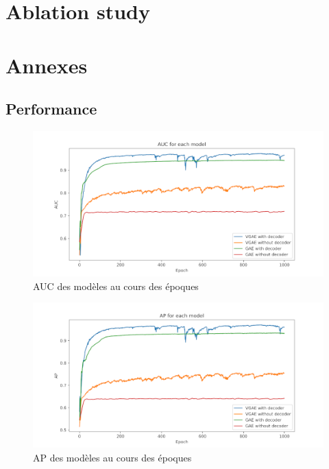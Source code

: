 \documentclass{article}
\begin{document}
\section{Ablation study}

\section{Annexes}

\subsection{Performance}
\begin{figure}[H]
    \centering
    \includegraphics[width=1\linewidth]{../test_performance/sans_degre_0dropout/AUC.png}
    \caption{AUC des modèles au cours des époques}
    \label{fig:fig_AUC}
\end{figure}

\begin{figure}[H]
    \centering
    \includegraphics[width=1\linewidth]{../test_performance/sans_degre_0dropout/AP.png}
    \caption{AP des modèles au cours des époques}
    \label{fig:fig_AP}
\end{figure}
\end{document}
